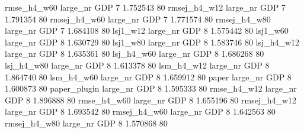  rmse_h4_w60   large_nr      GDP                 7 1.752543 80
rmsej_h4_w12   large_nr      GDP                 7 1.791354 80
rmsej_h4_w60   large_nr      GDP                 7 1.771574 80
rmsej_h4_w80   large_nr      GDP                 7 1.684108 80
    lsj1_w12   large_nr      GDP                 8 1.575442 80
    lsj1_w60   large_nr      GDP                 8 1.630729 80
    lsj1_w80   large_nr      GDP                 8 1.583746 80
  lsj_h4_w12   large_nr      GDP                 8 1.635361 80
  lsj_h4_w60   large_nr      GDP                 8 1.686268 80
  lsj_h4_w80   large_nr      GDP                 8 1.613378 80
  lsm_h4_w12   large_nr      GDP                 8 1.864740 80
  lsm_h4_w60   large_nr      GDP                 8 1.659912 80
       paper   large_nr      GDP                 8 1.600873 80
paper_plugin   large_nr      GDP                 8 1.595333 80
 rmse_h4_w12   large_nr      GDP                 8 1.896888 80
 rmse_h4_w60   large_nr      GDP                 8 1.655196 80
rmsej_h4_w12   large_nr      GDP                 8 1.693542 80
rmsej_h4_w60   large_nr      GDP                 8 1.642563 80
rmsej_h4_w80   large_nr      GDP                 8 1.570868 80